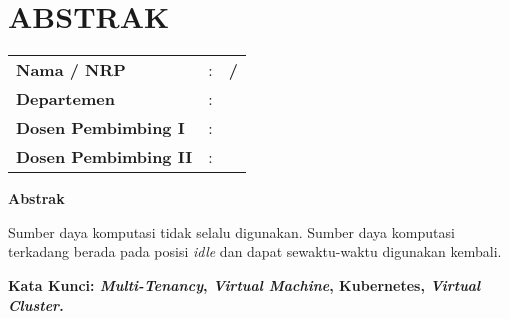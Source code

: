 \chapter*{ABSTRAK}


\vspace{2ex}

\begin{center}
  \large\textbf{\tatitle{}}
\end{center}

\vspace{2ex}

\begingroup
\setlength{\tabcolsep}{0pt}

\noindent
\begin{tabularx}{\textwidth}{l >{\centering}m{2em} X}
  \textbf{Nama / NRP}           & : & \textbf{\name{} / \nrp{}} \\
  \textbf{Departemen}           & : & \textbf{\department{}}    \\
  \textbf{Dosen Pembimbing I}   & : & \textbf{\advisor{}}       \\
  \textbf{Dosen Pembimbing II}  & : & \textbf{\coadvisor{}}     \\
\end{tabularx}
\endgroup

\noindent
\textbf{Abstrak}

Sumber daya komputasi tidak selalu digunakan.
Sumber daya komputasi terkadang berada pada posisi
\emph{idle} dan dapat sewaktu-waktu digunakan kembali.


\vspace{2ex}
\noindent
\textbf{Kata Kunci: \emph{Multi-Tenancy}, \emph{Virtual Machine}, Kubernetes, \emph{Virtual Cluster}.}
